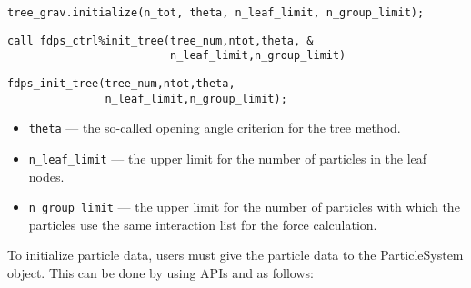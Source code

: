 \ifCpp %
\begin{lstlisting}[caption=Initialization of \textsf{Tree} object]
tree_grav.initialize(n_tot, theta, n_leaf_limit, n_group_limit);
\end{lstlisting}
\endifCpp
\ifFtn %
\begin{lstlisting}[caption=Initialization of \textsf{Tree} object]
call fdps_ctrl%init_tree(tree_num,ntot,theta, &
                         n_leaf_limit,n_group_limit)
\end{lstlisting}
\endifFtn
\ifC %
\begin{lstlisting}[caption=Initialization of \textsf{Tree} object]
fdps_init_tree(tree_num,ntot,theta,
               n_leaf_limit,n_group_limit);
\end{lstlisting}
\endifC

\begin{itemize}[leftmargin=*,topsep=-1ex,parsep=-1ex]
\item \texttt{theta} --- the so-called opening angle criterion for the tree method.
\item \texttt{n\_leaf\_limit} --- the upper limit for the number of particles in the leaf nodes.
\item \texttt{n\_group\_limit} --- the upper limit for the number of particles with which the particles use the same interaction list for the force calculation.
\end{itemize}


\ifIF %
\label{s3sec:nbody_initialize_ptcl_data}
To initialize particle data, users must give the particle data to the \textsf{ParticleSystem} object. This can be done by using APIs  and  as follows:

